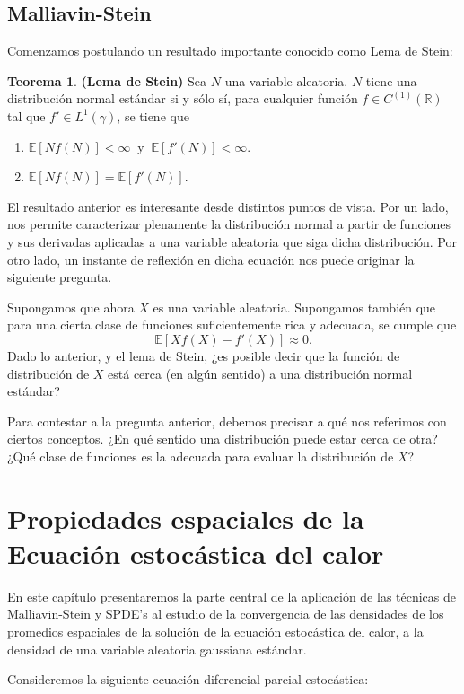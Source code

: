 \documentclass[letterpaper,twoside,12pt]{book}
\newcommand{\R}{\mathbb{R}}
\newcommand{\E}{\mathbb{E}}
\newcommand{\1}{\mathds{1}}
\theoremstyle{definition}
\theoremstyle{definition}
\newtheorem{teo}{Teorema}
\theoremstyle{definition}
\theoremstyle{definition}
\theoremstyle{definition}
\theoremstyle{definition}
\theoremstyle{definition}
\begin{document}
\section{Malliavin-Stein}
Comenzamos postulando un resultado importante conocido como Lema de Stein:
\begin{teo}\textbf{(Lema de Stein)} Sea $N$ una variable aleatoria. $N$ tiene una distribución normal estándar si y sólo sí, para cualquier función $f\in C^{(1)}(\R)$ tal que $f'\in L^{1}(\gamma)$, se tiene que
    \begin{enumerate}
        \item $\E\left[Nf(N)\right]<\infty \ $ y $ \ \E\left[f'(N)\right]<\infty$.
        \item $\E\left[Nf(N)\right]=\E\left[f'(N)\right]$.
    \end{enumerate}
 \end{teo}
El resultado anterior es interesante desde distintos puntos de vista. Por un lado, nos permite caracterizar plenamente la distribución normal a partir de funciones y sus derivadas aplicadas a una variable aleatoria que siga dicha distribución. Por otro lado, un instante de reflexión en dicha ecuación nos puede originar la siguiente pregunta.

Supongamos que ahora $X$ es una variable aleatoria. Supongamos también que para una cierta clase de funciones suficientemente rica y adecuada, se cumple que 
\[
\E\left[Xf(X)-f'(X)\right]\approx0.    
\]
Dado lo anterior, y el lema de Stein, ¿es posible decir que la función de distribución de $X$ está cerca (en algún sentido) a una distribución normal estándar?

Para contestar a la pregunta anterior, debemos precisar a qué nos referimos con ciertos conceptos. ¿En qué sentido una distribución puede estar cerca de otra? ¿Qué clase de funciones es la adecuada para evaluar la distribución de $X$? 




\chapter{Propiedades espaciales de la Ecuación estocástica del calor}
En este capítulo presentaremos la parte central de la aplicación de las técnicas de Malliavin-Stein y SPDE's al estudio de la convergencia de las densidades de los promedios espaciales de la solución de la ecuación estocástica del calor, a la densidad de una variable aleatoria gaussiana estándar.

Consideremos la siguiente ecuación diferencial parcial estocástica:
\end{document}

